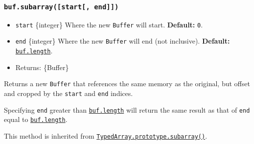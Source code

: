 \begin{Shaded}
\begin{Highlighting}[]
\NormalTok{ \{ }\NormalTok{ \} }\OperatorTok{=} \NormalTok{(}\NormalTok{)}\OperatorTok{;}

\OperatorTok{=} \NormalTok{([}\OperatorTok{,} \OperatorTok{,} \OperatorTok{,} \OperatorTok{,} \OperatorTok{,} \NormalTok{])}\OperatorTok{;}

\NormalTok{(}\OperatorTok{,} \NormalTok{)}\NormalTok{(}\NormalTok{))}\OperatorTok{;}
\end{Highlighting}
\end{Shaded}

\subsubsection{\texorpdfstring{\texttt{buf.subarray({[}start{[},\ end{]}{]})}}{buf.subarray({[}start{[}, end{]}{]})}}\label{buf.subarraystart-end}

\begin{itemize}
\tightlist
\item
  \texttt{start} \{integer\} Where the new \texttt{Buffer} will start.
  \textbf{Default:} \texttt{0}.
\item
  \texttt{end} \{integer\} Where the new \texttt{Buffer} will end (not
  inclusive). \textbf{Default:}
  \hyperref[buflength]{\texttt{buf.length}}.
\item
  Returns: \{Buffer\}
\end{itemize}

Returns a new \texttt{Buffer} that references the same memory as the
original, but offset and cropped by the \texttt{start} and \texttt{end}
indices.

Specifying \texttt{end} greater than
\hyperref[buflength]{\texttt{buf.length}} will return the same result as
that of \texttt{end} equal to \hyperref[buflength]{\texttt{buf.length}}.

This method is inherited from
\href{https://developer.mozilla.org/en-US/docs/Web/JavaScript/Reference/Global_Objects/TypedArray/subarray}{\texttt{TypedArray.prototype.subarray()}}.

